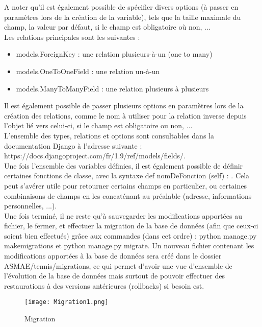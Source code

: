 A noter qu'il est également possible de spécifier divers options (à passer en paramètres lors de la création de la variable), tels que la taille maximale du champ, la valeur par défaut, si le champ est obligatoire où non, ...\\

Les relations principales sont les suivantes :\\
\begin{itemize}
\item models.ForeignKey : une relation plusieurs-à-un (one to many)
\item models.OneToOneField : une relation un-à-un
\item models.ManyToManyField : une relation plusieurs à plusieurs\\
\end{itemize}

Il est également possible de passer plusieurs options en paramètres lors de la création des relations, comme le nom à utiliser pour la relation inverse depuis l’objet lié vers celui-ci, si le champ est obligatoire ou non, ...\\

L'ensemble des types, relations et options sont consultables dans la documentation Django à l'adresse suivante : https://docs.djangoproject.com/fr/1.9/ref/models/fields/.\\

Une fois l'ensemble des variables définies, il est également possible de définir certaines fonctions de classe, avec la syntaxe def nomDeFonction (self) : . Cela peut s'avérer utile pour retourner certains champs en particulier, ou certaines combinaisons de champs en les concaténant au préalable (adresse, informations personnelles, ...).\\

Une fois terminé, il ne reste qu'à sauvegarder les modifications apportées au fichier, le fermer, et effectuer la migration de la base de données (afin que ceux-ci soient bien effectués) grâce aux commandes (dans cet ordre) : python manage.py makemigrations et python manage.py migrate. Un nouveau fichier contenant les modifications apportées à la base de données sera créé dans le dossier ASMAE/tennis/migrations, ce qui permet d'avoir une vue d'ensemble de l'évolution de la base de données mais surtout de pouvoir effectuer des restaurations à des versions antérieures (rollbacks) si besoin est.\\

\begin{figure}[H]
\centering
\texttt{[image: Migration1.png]}
\caption{Migration}
\end{figure}

